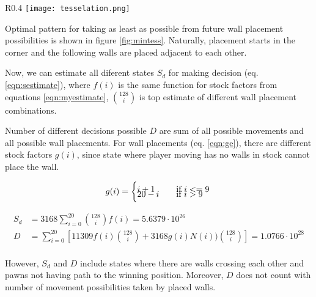 \begin{wrapfigure}{R}{0.4\textwidth}
  \vspace*{-0.60cm}
  \centering
  \texttt{[image: tesselation.png]}
  \vspace*{-0.20cm}
  \caption{min. tesselation example}
  \label{fig:mintess}
  \vspace*{-0.20cm}
\end{wrapfigure}

Optimal pattern for taking as least as possible from future wall placement
possibilities is shown in figure \ref{fig:mintess}. Naturally, placement starts
in the corner and the following walls are placed adjacent to each other.

Now, we can estimate all diferent states $S_d$ for making decision
(eq.  \ref{eqn:sestimate}), where $f(i)$ is the same function for stock factors
from equations \ref{eqn:myestimate}, ${128 \choose i}$ is top estimate
of different wall placement combinations.

Number of different decisions possible $D$ are sum of all possible
movements and all possible wall placements. For wall placements
(eq. \ref{eqn:ge}), there are different stock factors $g(i)$, since state
where player moving has no walls in stock cannot place the wall.

\begin{equation}
  \label{eqn:ge}
  g(i) =
    \begin{cases}
      i + 1  & \quad \text{if } i <= 9 \\[-0.30cm]
      20 - i & \quad \text{if } i > 9
    \end{cases}\\
\end{equation}

\begin{equation}
  \label{eqn:sestimate}
  \begin{aligned}
    S_d &= 3168{\sum_{i=0}^{20}}{128 \choose i}f(i)
         = 5.6379{\cdot}10^{26} \\
    D &= {\sum_{i=0}^{20}}
         \left[
           11309f(i){128 \choose i}
           +
           3168g(i)N(i)){128 \choose i}
         \right]
       = 1.0766{\cdot}10^{28} \\
  \end{aligned}
\end{equation}

However, $S_d$ and $D$ include states where there are walls crossing each other and
pawns not having path to the winning position.
Moreover, $D$ does not count with number of movement possibilities taken
by placed walls.

